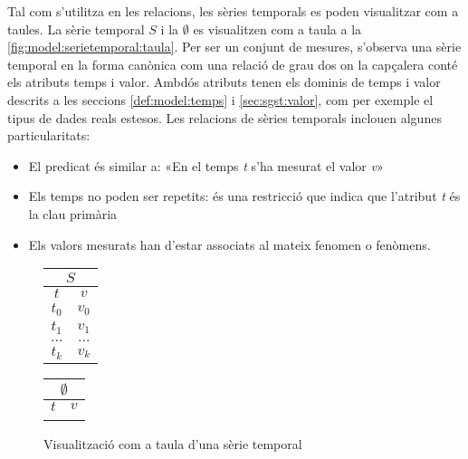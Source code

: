 Tal com s'utilitza en les relacions, les sèries temporals es poden
visualitzar com a taules. La sèrie temporal $S$ i la $\emptyset$
es visualitzen com a taula a la
\autoref{fig:model:serietemporal:taula}.
Per ser un conjunt de mesures, s'observa una sèrie temporal en la
forma canònica com una relació de grau dos on la capçalera conté els
atributs temps i valor. Ambdós atributs tenen els dominis de temps i
valor descrits a les seccions \ref{def:model:temps} i
\ref{sec:sgst:valor}, com per exemple el tipus de dades reals
estesos. Les relacions de sèries temporals inclouen algunes
particularitats:


\begin{itemize}
\item El predicat és similar a: «En el temps \emph{t} s'ha mesurat el
  valor \emph{v}»
\item Els temps no poden ser repetits: és una restricció que indica
  que l'atribut \emph{t} és la clau primària
\item Els valors mesurats han d'estar associats al mateix fenomen o
  fenòmens.
\end{itemize}

\begin{figure}[tp]
  \centering
  \begin{tabular}[c]{|c|c|}
    \multicolumn{2}{c}{$S$} \\ \hline
    $t$  & $v$ \\ \hline
    $t_0$  & $v_0$ \\
    $t_1$  & $v_1$ \\
    $\dots$  & $\dots$ \\ 
    $t_k$  & $v_k$ \\ \hline
  \end{tabular} \qquad
  \begin{tabular}[c]{|c|c|}
    \multicolumn{2}{c}{$\emptyset$} \\ \hline
    $t$  & $v$ \\ \hline
      &  \\ \hline
  \end{tabular}
  \caption{Visualització com a taula d'una sèrie temporal}
  \label{fig:model:serietemporal:taula}
\end{figure}













